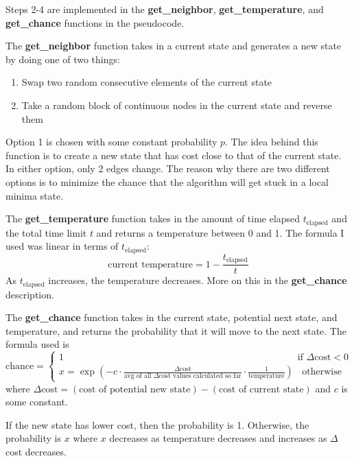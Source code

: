 \documentclass[11pt,letterpaper]{article}
\begin{document}
Steps 2-4 are implemented in the \textbf{get\_neighbor}, \textbf{get\_temperature}, and \textbf{get\_chance} functions in the pseudocode.
\begin{framed}
\noindent The \textbf{get\_neighbor} function takes in a current state and generates a new state by doing one of two things:
\begin{enumerate}
\item Swap two random consecutive elements of the current state
\item Take a random block of continuous nodes in the current state and reverse them
\end{enumerate}
Option 1 is chosen with some constant probability $p$. The idea behind this function is to create a new state that has cost close to that of the current state. In either option, only 2 edges change. The reason why there are two different options is to minimize the chance that the algorithm will get stuck in a local minima state.
\end{framed}
\begin{framed}
\noindent The \textbf{get\_temperature} function takes in the amount of time elapsed $t_\text{elapsed}$ and the total time limit $t$ and returns a temperature between 0 and 1. The formula I used was linear in terms of $t_\text{elapsed}$:
\[\text{current temperature}=1-\frac{t_\text{elapsed}}{t}\]
As $t_\text{elapsed}$ increases, the temperature decreases. More on this in the \textbf{get\_chance} description.
\end{framed}
\begin{framed}
\noindent The \textbf{get\_chance} function takes in the current state, potential next state, and temperature, and returns the probability that it will move to the next state. The formula used is
\[\text{chance}=\begin{cases}1\qquad\qquad\qquad\qquad\qquad\qquad\qquad\qquad\qquad\qquad\qquad\qquad\text{ if }\Delta\text{cost}<0\\
x=\exp\left(-c\cdot\frac{\Delta\text{cost}}{\text{avg of all }\Delta\text{cost values calculated so far}}\cdot\frac1{\text{temperature}}\right)\;\;\text{ otherwise}\end{cases}\]
where $\Delta\text{cost} = (\text{cost of potential new state})-(\text{cost of current state})$ and $c$ is some constant.

If the new state has lower cost, then the probability is 1. Otherwise, the probability is $x$ where $x$ decreases as temperature decreases and increases as $\Delta$cost decreases.
\end{framed}
\end{document}
